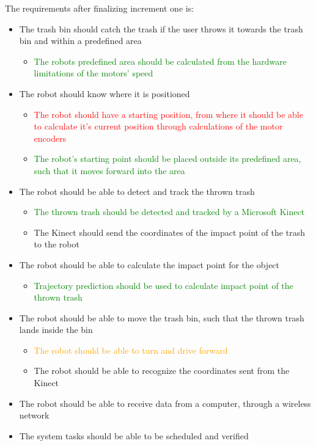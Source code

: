 The requirements after finalizing increment one is:
\begin{itemize}
\item The trash bin should catch the trash if the user throws it towards the trash bin and within a predefined area
\begin{itemize}
	\item \textcolor{green}{The robots predefined area should be calculated from the hardware limitations of the motors’ speed}
\end{itemize}
\item The robot should know where it is positioned
\begin{itemize}
	\item \textcolor{red}{The robot should have a starting position, from where it should be able to calculate it's current position through calculations of the motor encoders}
	\item \textcolor{green}{The robot's starting point should be placed outside its predefined area, such that it moves forward into the area}
\end{itemize}
\item The robot should be able to detect and track the thrown trash
\begin{itemize}
	\item \textcolor{green}{The thrown trash should be detected and tracked by a Microsoft Kinect}
	\item The Kinect should send the coordinates of the impact point of the trash to the robot
\end{itemize}
\item The robot should be able to calculate the impact point for the object
\begin{itemize}
	\item \textcolor{green}{Trajectory prediction should be used to calculate impact point of the thrown trash}
\end{itemize}
\item The robot should be able to move the trash bin, such that the thrown trash lands inside the bin
\begin{itemize}
	\item \textcolor{orange}{The robot should be able to turn and drive forward}
	\item {The robot should be able to recognize the coordinates sent from the Kinect}
\end{itemize}
\item {The robot should be able to receive data from a computer, through a wireless network}
\item {The system tasks should be able to be scheduled and verified}
\end{itemize}
